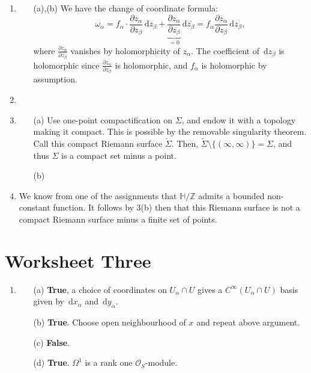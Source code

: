 \documentclass[a4paper]{report}
\theoremstyle{definition}
\theoremstyle{remark}
\theoremstyle{proposition}
\theoremstyle{conjecture}
\theoremstyle{lemma}
\theoremstyle{corollary}
\theoremstyle{exercise}
\theoremstyle{example}
\newcommand{\mcal}{\mathcal}
\newcommand{\diff}{\,\mathrm{d}}
\begin{document}
\begin{enumerate}
    \item
        \begin{itemize}
            \item[(a),(b)] We have the change of coordinate formula:
                $$\omega_\alpha = f_\alpha \cdot \frac{\partial z_\alpha}{\partial z_\beta} \diff z_\beta + \underbrace{\frac{\partial z_\alpha}{\partial \overline{z_\beta}}}_{=0} \diff \overline{z_\beta} = f_\alpha \frac{\partial z_\alpha}{\partial z_\beta}\diff z_\beta,$$
                where $\frac{\partial z_\alpha}{\partial \overline{z_\beta}}$
                vanishes by holomorphicity of $z_\alpha$.
                The coefficient of $\diff z_\beta$ is holomorphic 
                since $\frac{\partial z_\alpha}{\partial z_\beta}$ is
                holomorphic, and $f_\alpha$ is holomorphic by assumption.
        \end{itemize}
    \item 
    \item 
        \begin{itemize}
            \item[(a)] Use one-point compactification on $\Sigma$, and endow
                it with a topology making it compact. This is possible by the removable singularity theorem. Call this compact Riemann surface
                $\widetilde{\Sigma}$. Then, $\widetilde{\Sigma}\setminus \lbrace (\infty,\infty)\rbrace  =\Sigma$, and thus $\Sigma$ is a compact 
                set minus a point. 
            \item[(b)]
        \end{itemize}
    \item  We know from one of the assignments that $\mathbb{H}/\mathbb{Z}$
        admits a bounded non-constant function. It follows by 3(b) 
        then that this Riemann surface is not a compact Riemann surface
        minus a finite set of points.
\end{enumerate}

\section{Worksheet Three}

\begin{enumerate}
    \item 
        \begin{itemize}
            \item[(a)]\textbf{True}, a choice of coordinates on 
                $U_\alpha \cap U$ gives a $C^\infty(U_\alpha \cap U)$ 
                basis given by $\diff x_\alpha$ and $\diff y_\alpha$.
            \item[(b)] \textbf{True}. Choose open neighbourhood of $x$ and repeat above argument.
            \item[(c)] \textbf{False}.
            \item[(d)] \textbf{True}. $\Omega^1$ is a rank one $\mcal{O}_S$-module.
        \end{itemize}
\end{enumerate}
\end{document}
